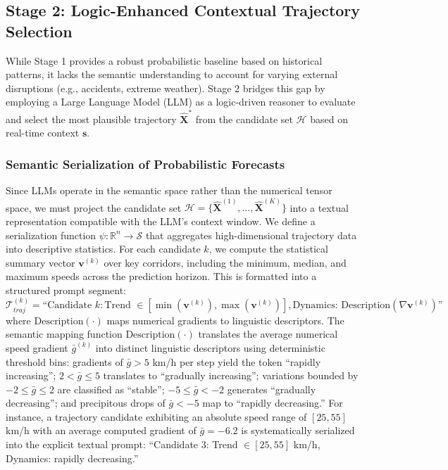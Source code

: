 \documentclass{article}
\begin{document}
\subsection{Stage 2: Logic-Enhanced Contextual Trajectory Selection}
While Stage 1 provides a robust probabilistic baseline based on historical patterns, it lacks the semantic understanding to account for varying external disruptions (e.g., accidents, extreme weather). Stage 2 bridges this gap by employing a Large Language Model (LLM) as a logic-driven reasoner to evaluate and select the most plausible trajectory $\hat{\mathbf{X}}^*$ from the candidate set $\mathcal{H}$ based on real-time context $\mathbf{s}$.

\subsubsection{Semantic Serialization of Probabilistic Forecasts}
Since LLMs operate in the semantic space rather than the numerical tensor space, we must project the candidate set $\mathcal{H} = \{\hat{\mathbf{X}}^{(1)}, \dots, \hat{\mathbf{X}}^{(K)}\}$ into a textual representation compatible with the LLM's context window.
We define a serialization function $\psi: \mathbb{R}^{n} \to \mathcal{S}$ that aggregates high-dimensional trajectory data into descriptive statistics. For each candidate $k$, we compute the statistical summary vector $\mathbf{v}^{(k)}$ over key corridors, including the minimum, median, and maximum speeds across the prediction horizon. This is formatted into a structured prompt segment:
\begin{equation}
    \mathcal{T}_{traj}^{(k)} = \text{``Candidate } k: \text{Trend } \in [\min(\mathbf{v}^{(k)}), \max(\mathbf{v}^{(k)})], \text{Dynamics: } \text{Description}(\nabla \mathbf{v}^{(k)}) \text{''}
\end{equation}
where $\text{Description}(\cdot)$ maps numerical gradients to linguistic descriptors. The semantic mapping function $\text{Description}(\cdot)$ translates the average numerical speed gradient $\bar{g}^{(k)}$ into distinct linguistic descriptors using deterministic threshold bins: gradients of $\bar{g} > 5$ km/h per step yield the token ``rapidly increasing''; $2 < \bar{g} \leq 5$ translates to ``gradually increasing''; variations bounded by $-2 \leq \bar{g} \leq 2$ are classified as ``stable''; $-5 \leq \bar{g} < -2$ generates ``gradually decreasing''; and precipitous drops of $\bar{g} < -5$ map to ``rapidly decreasing.'' For instance, a trajectory candidate exhibiting an absolute speed range of $[25, 55]$ km/h with an average computed gradient of $\bar{g} = -6.2$ is systematically serialized into the explicit textual prompt: ``Candidate 3: Trend $\in [25, 55]$ km/h, Dynamics: rapidly decreasing.''
\end{document}
